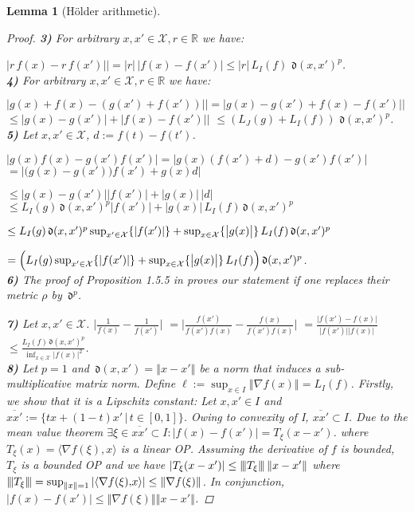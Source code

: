\documentclass{article} %
\newtheorem{lem}[thm]{Lemma}
\theoremstyle{definition}
\theoremstyle{remark}
\newcommand{\matnorm}[1]{{\left\vert\kern-0.25ex\left\vert\kern-0.25ex\left\vert #1 
    \right\vert\kern-0.25ex\right\vert\kern-0.25ex\right\vert}}
\newcommand{\norm}[1]{\left\Vert#1\right\Vert}
\newcommand{\abs}[1]{\left\vert#1\right\vert}
\newcommand{\Real}{\mathbb R}
\newcommand{\vc}[1]{#1}
\newcommand{\SP}[2]{\ensuremath{\mathbf{\langle} \vc{#1} \mathbf{,} \vc{#2} \mathbf{\rangle}}}
\newcommand{\inspace}{\ensuremath{ \mathcal X}}
\newcommand{\metric}{\, \mathfrak{d}} %
\begin{document}
\begin{lem}[H\"older arithmetic]
\begin{proof}
\textbf{3)}  For arbitrary $x,x' \in \inspace , r \in \Real$ we have:

$\bigl| r \, f(x) - r \, f(x')| \bigr| = |r|\, |f(x) - f(x')| \leq |r| \,L_I(f)\,  \metric(x,x')^{p}$.\\ 

\textbf{4)}  For arbitrary $x,x' \in \inspace , r \in \Real$ we have:

$\bigl| g(x) + f(x) - (g(x') + f(x'))| \bigr| = \bigl| g(x)  - g(x') + f(x)- f(x')| \bigr|$ 
$\leq \bigl| g(x)  - g(x')\bigr|  + \bigl| f(x)- f(x')| \bigr|$ $\leq (L_J(g)+L_I(f))\,  \metric(x,x')^{p}$.\\

\textbf{5)}  Let  $x,x' \in \inspace $, $d := f(t) - f(t')$.

$\bigl| g(x) f(x) - g(x')  f(x') \bigr| = \bigl| g(x) (f(x') +d) - g(x') f(x') \bigr|$ 
$= \bigl|\bigl( g(x) - g(x') \bigl)  f(x')+ g(x)  d \bigr|  $

$\leq \bigl| g(x) - g(x') \bigr|  |f(x')|   + \bigl|g(x)\bigr| \,  |d|  $
$\leq L_I(g) \metric(x,x')^p  |f(x')|   + \bigl|g(x)\bigr| \,  L_I(f) \metric(x,x')^p  $

$\leq L_I(g) \metric(x,x')^p  \sup_{x' \in \inspace } \{|f(x')|\}  \\ + \sup_{x \in \inspace }\{\bigl|g(x)\bigr|\} \,  L_I(f) \metric(x,x')^p  $

$= \Bigl(L_I(g)  \sup_{x' \in \inspace } \{|f(x')|\}   \\+ \sup_{x \in \inspace }\{\bigl|g(x)\bigr|\} \,  L_I(f)\Bigl) \metric(x,x')^p  $.\\

\textbf{6)}  The proof of Proposition 1.5.5 in \cite{Weaver1999} proves our statement if one replaces their 
metric $\rho$ by $\metric^p$.

\textbf{7)}  Let  $x,x' \in \inspace $.
$\bigl| \frac{1}{f(x)} - \frac{1}{f(x')} \bigr|$ 
$=\bigl| \frac{f(x')}{f(x') f(x)} -\frac{f(x)}{f(x') f(x)} \bigr|$ 
$= \frac{\bigl|f(x')-f(x) \bigr|}{\bigl|f(x')\bigr| \bigr| f(x)\bigr|}$ 
$\leq \frac{L_I(f) \metric(x,x')^p}{\inf_{x \in \inspace } |f(x)|^2}$.\\

\textbf{8)} Let $p=1$ and $\metric(x,x') = \norm{x-x'}$ be a norm that induces a sub-multiplicative matrix norm. Define $\ell := \sup_{x \in I } \norm{ \nabla f(x) } = L_I(f)$. 
Firstly, we show that it is a Lipschitz constant: Let $x,x' \in I $ and 
$\overline{xx'} := \{tx + (1-t) x' \, | \, t \in [0,1]\}$. 
Owing to convexity of I, $\overline{xx'} \subset I$. Due to the mean value theorem $\exists \xi \in \overline{xx'} \subset I: |f(x) - f(x')|=  T_\xi (x-x')$. where $T_\xi (x) = \SP{\nabla f(\xi)}{ x}$ is a linear OP. Assuming the derivative of $f$ is bounded, $T_\xi$ is a bounded OP and we have $\abs{T_\xi (x-x') } \leq \matnorm{T_\xi} \norm{x-x'}$ where 
$\matnorm{T_\xi} = \sup_{\norm{x} = 1} \abs{\SP{\nabla f(\xi)}{x}} \leq \norm{\nabla f(\xi)}$. In conjunction,
$|f(x) - f(x')| \leq \norm{\nabla f(\xi)} \norm{x-x'}$. 


\end{proof}
\end{lem}
\end{document}
